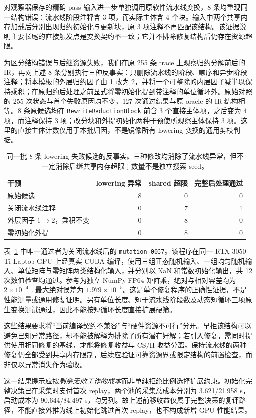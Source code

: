 对观察器保存的精确 pass 输入进一步单独调用原软件流水线变换，8 条均重现同一结构错误：流水线阶段注释含 3 项，而实际主体含 4 个块。输入中两个共享内存加载后分别出现归约初始化与更新块，原 3 项注释不再匹配该结构。该证据说明主要长尾的直接触发点是变换契约不一致；它并不排除修复结构后仍存在资源超限。

为区分结构错误与后继资源失败，我们在原 255 条 trace 上观察归约分解前后的 IR，再对上述 8 条分别执行三种反事实：只删除流水线的阶段、顺序和异步阶段注释；将本模板的外层归约因子由 1 改为 2，并将一个可整除的内层因子减半以保持乘积；在原归约后处理之前显式将零初始化提到带注释的单位循环外。原始对照的 255 次状态与首个失败原因均不变，127 次通过结果与原 oracle 的 IR 结构相等。8 条原候选均在 \texttt{RewriteReductionBlock} 前含 3 个直接主体项，之后变为 4 项，而注释保持 3 项；改分块和外提初始化两种干预使所观察主体保持 3 项。这里的直接主体计数仅用于本批归因，不是镜像所有 lowering 变换的通用剪枝判据。

\begin{table}[tb]
\centering
\caption{同一批 8 条 lowering 失败候选的反事实。三种修改均消除了流水线异常，但不一定消除后继共享内存超限；数量不是独立搜索 seed。}
\label{tab:pipeline-counterfactual}
\begin{tabular}{lrrr}
\toprule
干预 & lowering 异常 & shared 超限 & 完整后处理通过 \\
\midrule
原始候选 & 8 & 0 & 0 \\
关闭流水线注释 & 0 & 7 & 1 \\
外层因子 $1\to2$，乘积不变 & 0 & 8 & 0 \\
零初始化外提 & 0 & 8 & 0 \\
\bottomrule
\end{tabular}
\end{table}

表~\ref{tab:pipeline-counterfactual} 中唯一通过者为关闭流水线后的 \texttt{mutation-0037}。该程序在同一 RTX 3050 Ti Laptop GPU 上经真实 CUDA 编译，使用三组正态随机输入、一组均匀随机输入、单位矩阵与零矩阵两类结构化输入，并分别以 NaN 和常数初始化输出，共 12 次数值检查均通过。参考为独立 NumPy FP64 矩阵乘，绝对与相对容差均为 $2\times10^{-4}$；最大绝对误差为 $1.979\times10^{-5}$。这是单个修复程序的正确性证据，不是性能测量或通用修复证明。另有单位长度、短于流水线阶段数及动态短循环三项原生变换测试通过，因此不能按短循环长度直接扩展硬筛。

这些结果要求将“当前编译契约不兼容”与“硬件资源不可行”分开。早拒该结构可以避免已知异常路径，却不能被解释为排除了所有潜在好解；若引入修复，需同时提供使用相同修复的基线，才能将修复收益与 CS/H 收益分离。保持流水线的两种修复仍全部受到共享内存限制，后续应验证可靠资源界或限定结构的前置检查，而非仅以异常消失作为验收。

这一结果提示应按\emph{剩余无效工作的成本}而非单纯拒绝比例选择扩展约束。初始化完整决策已在采集时支付首次 replay，两个池的采集总成本分别为 3.621/21.958 s，启动成本为 90.644/84.497 s，均另列。故上述前移收益仅属于完整决策的复评路径，不能直接外推为线上初始化跳过首次 replay，也不构成新增 GPU 性能结果。

